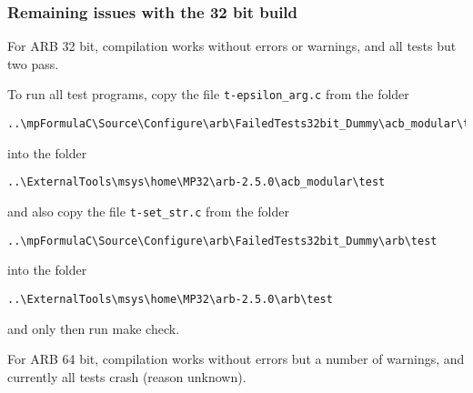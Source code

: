 \subsubsection{Remaining issues with the 32 bit build}

For ARB 32 bit, compilation works without errors or warnings, and all tests but two pass.

To run all test  programs, copy the file  \verb|t-epsilon_arg.c|  from the folder
\begin{verbatim}
..\mpFormulaC\Source\Configure\arb\FailedTests32bit_Dummy\acb_modular\test
\end{verbatim}
into the folder
\begin{verbatim}
..\ExternalTools\msys\home\MP32\arb-2.5.0\acb_modular\test
\end{verbatim}


and also copy the file  \verb|t-set_str.c|  from the folder
\begin{verbatim}
..\mpFormulaC\Source\Configure\arb\FailedTests32bit_Dummy\arb\test
\end{verbatim}
into the folder
\begin{verbatim}
..\ExternalTools\msys\home\MP32\arb-2.5.0\arb\test
\end{verbatim}


and only then run make check.



\vpara
For ARB 64 bit, compilation works without errors but a number of warnings, and currently all tests crash (reason unknown).






